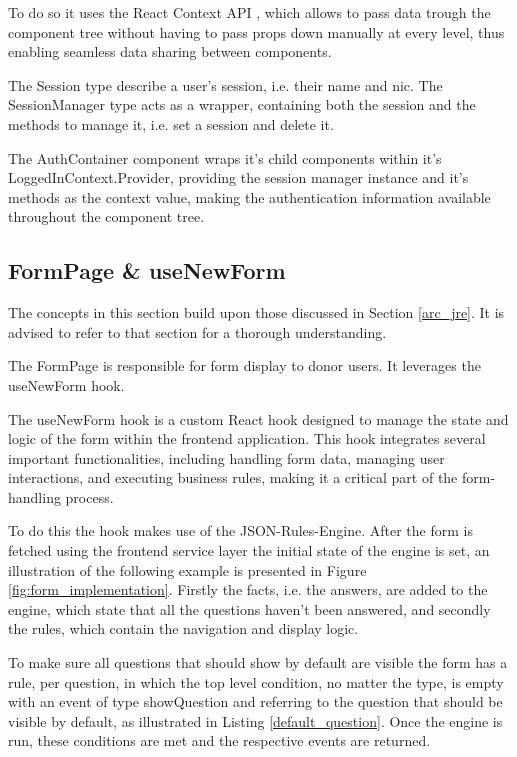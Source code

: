 To do so it uses the React Context API \cite{React_Context_API}, which allows to pass data trough the component tree without having to pass props down manually at every level, thus enabling seamless data sharing between components.

The Session type describe a user's session, i.e. their name and nic. The SessionManager type acts as a wrapper, containing both the session and the methods to manage it, i.e. set a session and delete it.

The AuthContainer component wraps it's child components within it's LoggedInContext.Provider, providing the session manager instance and it's methods as the context value, making the authentication information available throughout the component tree.

\newpage
\subsection{FormPage \& useNewForm}\label{form_implementation}

The concepts in this section build upon those discussed in Section \ref{arc_jre}. It is advised to refer to that section for a thorough understanding.

The FormPage is responsible for form display to donor users. It leverages the useNewForm hook.

The useNewForm hook is a custom React hook designed to manage the state and logic of the form within the frontend application. This hook integrates several important functionalities, including handling form data, managing user interactions, and executing business rules, making it a critical part of the form-handling process.

To do this the hook makes use of the JSON-Rules-Engine. After the form is fetched using the frontend service layer the initial state of the engine is set, an illustration of the following example is presented in Figure \ref{fig:form_implementation}.
Firstly the facts, i.e. the answers, are added to the engine, which state that all the questions haven't been answered, and secondly the rules, which contain the navigation and display logic.

To make sure all questions that should show by default are visible the form has a rule, per question, in which the top level condition, no matter the type, is empty with an event of type showQuestion and referring to the question that should be visible by default, as illustrated in Listing \ref{default_question}.
Once the engine is run, these conditions are met and the respective events are returned.

